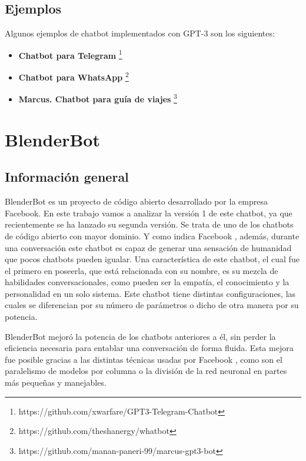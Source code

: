 \subsection*{Ejemplos}

Algunos ejemplos de chatbot implementados con GPT-3 son los siguientes:

\begin{itemize}
\item \textbf{Chatbot para Telegram} \footnote{https://github.com/xwarfare/GPT3-Telegram-Chatbot}
\item \textbf{Chatbot para WhatsApp} \footnote{https://github.com/theshanergy/whatbot}
\item \textbf{Marcus. Chatbot para guía de viajes} \footnote{https://github.com/manan-paneri-99/marcus-gpt3-bot}
\end{itemize}


\section{BlenderBot}

\subsection*{Información general}

BlenderBot es un proyecto de código abierto desarrollado por la empresa Facebook. En este trabajo vamos a analizar la versión 1 de este chatbot, ya que recientemente se ha lanzado su segunda versión. Se trata de uno de los chatbots de código abierto con mayor dominio. Y como indica Facebook \cite{RefWorks:RefID:41-roller2020recipes}, además, durante una conversación este chatbot es capaz de generar una sensación de humanidad que pocos chatbots pueden igualar. Una característica de este chatbot, el cual fue el primero en poseerla, que está relacionada con su nombre, es su mezcla de habilidades conversacionales, como pueden ser la empatía, el conocimiento y la personalidad en un solo sistema. Este chatbot tiene distintas configuraciones, las cuales se diferencian por su número de parámetros o dicho de otra manera por su potencia.

BlenderBot mejoró la potencia de los chatbots anteriores a él, sin perder la eficiencia necesaria para entablar una conversación de forma fluida. Esta mejora fue posible gracias a las distintas técnicas usadas por Facebook \cite{RefWorks:RefID:41-roller2020recipes}, como son el paralelismo de modelos por columna o la división de la red neuronal en partes más pequeñas y manejables.

